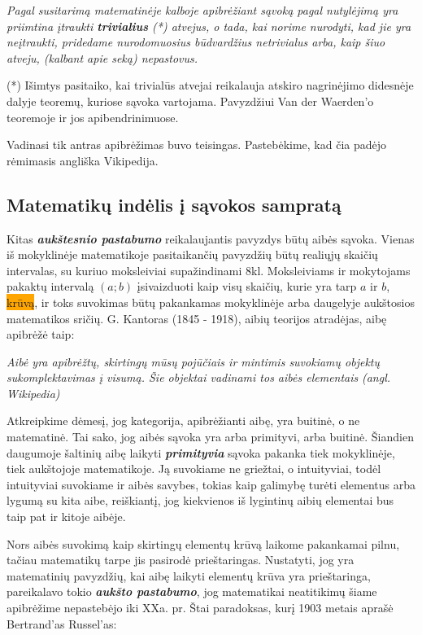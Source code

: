 \documentclass{article}
\begin{document}
\textit{Pagal susitarimą matematinėje kalboje apibrėžiant sąvoką pagal nutylėjimą yra priimtina įtraukti \textbf{trivialius} (*) atvejus, o tada, kai norime nurodyti, kad jie yra neįtraukti, pridedame nurodomuosius būdvardžius netrivialus arba, kaip šiuo atveju, (kalbant apie seką) nepastovus.}

{\small{(*) Išimtys pasitaiko, kai trivialūs atvejai reikalauja atskiro nagrinėjimo didesnėje dalyje teoremų, kuriose sąvoka vartojama. Pavyzdžiui Van der Waerden'o teoremoje ir jos apibendrinimuose.}}

Vadinasi tik antras apibrėžimas buvo teisingas. Pastebėkime, kad čia padėjo rėmimasis angliška Vikipedija.

\subsection{Matematikų indėlis į sąvokos sampratą}
Kitas \textit{\textbf{aukštesnio pastabumo}} reikalaujantis pavyzdys būtų aibės sąvoka. Vienas iš mokyklinėje matematikoje pasitaikančių pavyzdžių būtų realiųjų skaičių intervalas, su kuriuo moksleiviai supažindinami 8kl. Moksleiviams ir mokytojams pakaktų intervalą $(a; b)$ įsivaizduoti kaip visų skaičių, kurie yra tarp $a$ ir $b$, \colorbox{orange}{krūvą}, ir toks suvokimas būtų pakankamas mokyklinėje arba daugelyje aukštosios matematikos sričių. G. Kantoras (1845 - 1918), aibių teorijos atradėjas, aibę apibrėžė taip:

\textit{Aibė yra apibrėžtų, skirtingų mūsų pojūčiais ir mintimis suvokiamų objektų sukomplektavimas į visumą. Šie objektai vadinami tos aibės elementais} \textit{(angl. Wikipedia)}

Atkreipkime dėmesį, jog kategorija, apibrėžianti aibę, yra buitinė, o ne matematinė. Tai sako, jog aibės sąvoka yra arba primityvi, arba buitinė. Šiandien daugumoje šaltinių aibę laikyti \textit{\textbf{primityvia}} sąvoka pakanka tiek mokyklinėje, tiek aukštojoje matematikoje. Ją suvokiame ne griežtai, o intuityviai, todėl intuityviai suvokiame ir aibės savybes, tokias kaip galimybę turėti elementus arba lygumą su kita aibe, reiškiantį, jog kiekvienos iš lygintinų aibių elementai bus taip pat ir kitoje aibėje.

Nors aibės suvokimą kaip skirtingų elementų krūvą laikome pakankamai pilnu, tačiau matematikų tarpe jis pasirodė prieštaringas. Nustatyti, jog yra matematinių pavyzdžių, kai aibę laikyti elementų krūva yra prieštaringa, pareikalavo tokio \textit{\textbf{aukšto pastabumo}}, jog matematikai neatitikimų šiame apibrėžime nepastebėjo iki XXa. pr. Štai paradoksas, kurį 1903 metais aprašė Bertrand'as Russel'as:
\end{document}
